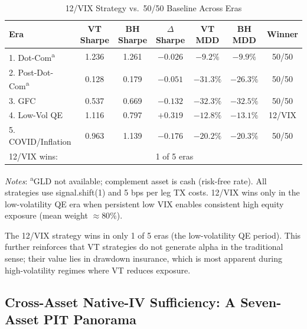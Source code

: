 \documentclass[12pt,a4paper]{article}
\begin{document}
\begin{table}[H]
\centering
\small
\begin{threeparttable}
\caption{12/VIX Strategy vs.\ 50/50 Baseline Across Eras}
\label{tab:strategy_eras}
\begin{tabular}{@{}lcccccc@{}}
\toprule
Era & VT Sharpe & BH Sharpe & $\Delta$Sharpe & VT MDD & BH MDD & Winner \\
\midrule
1. Dot-Com\textsuperscript{a} & 1.236 & 1.261 & $-0.026$ & $-9.2\%$ & $-9.9\%$ & 50/50 \\
2. Post-Dot-Com\textsuperscript{a} & 0.128 & 0.179 & $-0.051$ & $-31.3\%$ & $-26.3\%$ & 50/50 \\
3. GFC & 0.537 & 0.669 & $-0.132$ & $-32.3\%$ & $-32.5\%$ & 50/50 \\
4. Low-Vol QE & 1.116 & 0.797 & $+0.319$ & $-12.8\%$ & $-13.1\%$ & 12/VIX \\
5. COVID/Inflation & 0.963 & 1.139 & $-0.176$ & $-20.2\%$ & $-20.3\%$ & 50/50 \\
\midrule
\multicolumn{3}{l}{12/VIX wins:} & \multicolumn{4}{l}{1 of 5 eras} \\
\bottomrule
\end{tabular}
\begin{tablenotes}
\small
\item \textit{Notes}: \textsuperscript{a}GLD not available; complement asset is cash (risk-free rate). All strategies use signal.shift(1) and 5 bps per leg TX costs. 12/VIX wins only in the low-volatility QE era when persistent low VIX enables consistent high equity exposure (mean weight $\approx 80\%$).
\end{tablenotes}
\end{threeparttable}
\end{table}

The 12/VIX strategy wins in only 1 of 5 eras (the low-volatility QE period). This further reinforces that VT strategies do not generate alpha in the traditional sense; their value lies in drawdown insurance, which is most apparent during high-volatility regimes where VT reduces exposure.

\subsection{Cross-Asset Native-IV Sufficiency: A Seven-Asset PIT Panorama}
\label{subsec:cross_asset_panorama}

\end{document}
